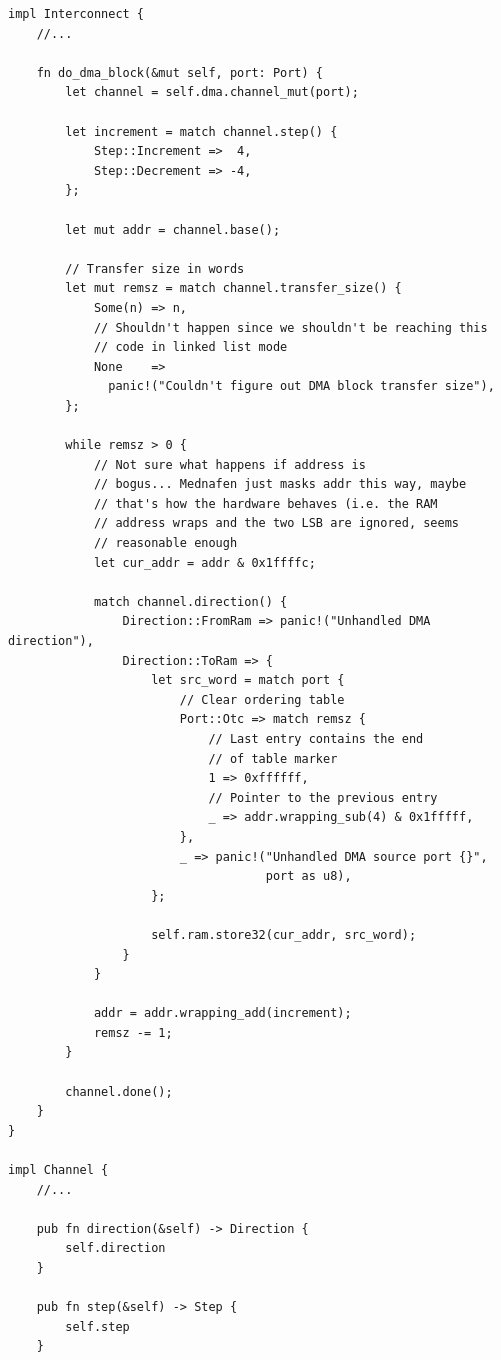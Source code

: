\documentclass[a4paper]{article}
\begin{document}
\begin{lstlisting}
impl Interconnect {
    //...

    fn do_dma_block(&mut self, port: Port) {
        let channel = self.dma.channel_mut(port);

        let increment = match channel.step() {
            Step::Increment =>  4,
            Step::Decrement => -4,
        };

        let mut addr = channel.base();

        // Transfer size in words
        let mut remsz = match channel.transfer_size() {
            Some(n) => n,
            // Shouldn't happen since we shouldn't be reaching this
            // code in linked list mode
            None    =>
              panic!("Couldn't figure out DMA block transfer size"),
        };

        while remsz > 0 {
            // Not sure what happens if address is
            // bogus... Mednafen just masks addr this way, maybe
            // that's how the hardware behaves (i.e. the RAM
            // address wraps and the two LSB are ignored, seems
            // reasonable enough
            let cur_addr = addr & 0x1ffffc;

            match channel.direction() {
                Direction::FromRam => panic!("Unhandled DMA direction"),
                Direction::ToRam => {
                    let src_word = match port {
                        // Clear ordering table
                        Port::Otc => match remsz {
                            // Last entry contains the end
                            // of table marker
                            1 => 0xffffff,
                            // Pointer to the previous entry
                            _ => addr.wrapping_sub(4) & 0x1fffff,
                        },
                        _ => panic!("Unhandled DMA source port {}",
                                    port as u8),
                    };

                    self.ram.store32(cur_addr, src_word);
                }
            }

            addr = addr.wrapping_add(increment);
            remsz -= 1;
        }

        channel.done();
    }
}

impl Channel {
    //...

    pub fn direction(&self) -> Direction {
        self.direction
    }

    pub fn step(&self) -> Step {
        self.step
    }


\end{lstlisting}
\end{document}

